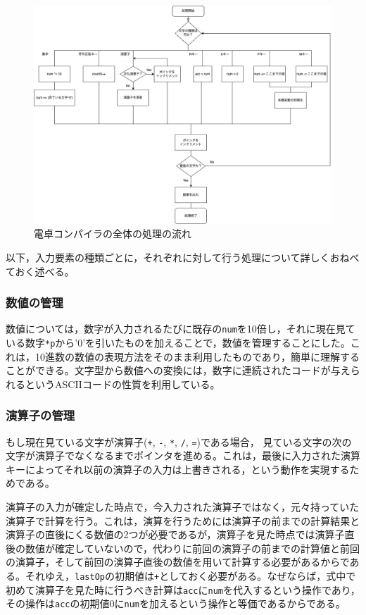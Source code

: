 \documentclass[a4paper]{jsarticle}
\newcommand{\var}[1]{\texttt{#1}}
\begin{document}
\begin{figure}[H]
    \centering
    \includegraphics[width=15cm]{./overall-flow.drawio.png}
    \caption{電卓コンパイラの全体の処理の流れ}
    \label{fig:flowchart}
\end{figure}

以下，入力要素の種類ごとに，それぞれに対して行う処理について詳しくおねべておく述べる。
\subsubsection{数値の管理}
数値については，数字が入力されるたびに既存の\var{num}を10倍し，それに現在見ている数字\var{*p}から'0'を引いたものを加えることで，数値を管理することにした。これは，10進数の数値の表現方法をそのまま利用したものであり，簡単に理解することができる。文字型から数値への変換には，数字に連続されたコードが与えられるというASCIIコードの性質を利用している。

\subsubsection{演算子の管理}
もし現在見ている文字が演算子(\var{+}, \var{-}, \var{*}, \var{/}, \var{=})である場合，   見ている文字の次の文字が演算子でなくなるまでポインタを進める。これは，最後に入力された演算キーによってそれ以前の演算子の入力は上書きされる，という動作を実現するためである。

演算子の入力が確定した時点で，今入力された演算子ではなく，元々持っていた演算子で計算を行う。これは，演算を行うためには演算子の前までの計算結果と演算子の直後にくる数値の2つが必要であるが，演算子を見た時点では演算子直後の数値が確定していないので，代わりに前回の演算子の前までの計算値と前回の演算子，そして前回の演算子直後の数値を用いて計算する必要があるからである。それゆえ，\var{lastOp}の初期値は\var{+}としておく必要がある。なぜならば，式中で初めて演算子を見た時に行うべき計算は\var{acc}に\var{num}を代入するという操作であり，その操作は\var{acc}の初期値0に\var{num}を加えるという操作と等価であるからである。
\end{document}
